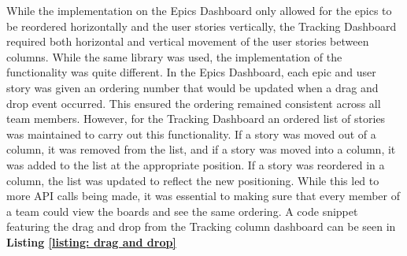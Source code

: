\documentclass[l4proj.tex]{subfiles}
\begin{document}
While the implementation on the Epics Dashboard only allowed for the epics to be reordered horizontally and the user stories vertically, the Tracking Dashboard required both horizontal and vertical movement of the user stories between columns. While the same library was used, the implementation of the functionality was quite different. In the Epics Dashboard, each epic and user story was given an ordering number that would be updated when a drag and drop event occurred. This ensured the ordering remained consistent across all team members. However, for the Tracking Dashboard an ordered list of stories was maintained to carry out this functionality. If a story was moved out of a column, it was removed from the list, and if a story was moved into a column, it was added to the list at the appropriate position. If a story was reordered in a column, the list was updated to reflect the new positioning. While this led to more API calls being made, it was essential to making sure that every member of a team could view the boards and see the same ordering. A code snippet featuring the drag and drop from the Tracking column dashboard can be seen in \textbf{Listing \ref{listing: drag and drop}}
\end{document}
